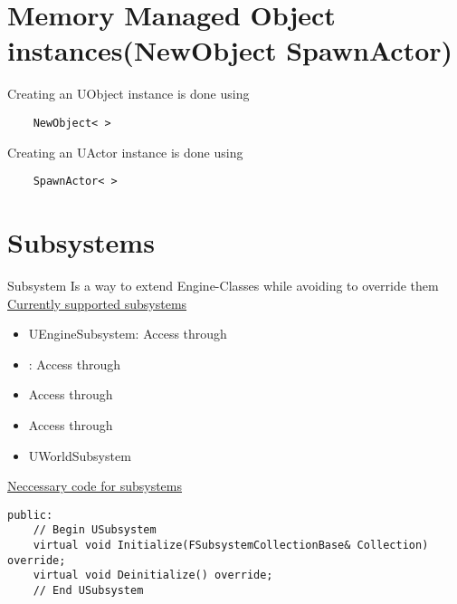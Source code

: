     \section{Memory Managed Object instances(NewObject SpawnActor)}
        Creating an UObject instance is done using
        \begin{lstlisting}
    NewObject< >
        \end{lstlisting}
        Creating an UActor instance is done using
        \begin{lstlisting}
    SpawnActor< >
        \end{lstlisting}

    \section{Subsystems}
        \glsdesc{Subsystem}
        Is a way to extend Engine-Classes while avoiding to override them \\
        \uline{Currently supported subsystems}
        \begin{itemize}
            \item UEngineSubsystem: Access through 
            \item {} : Access through 
            \item {} Access through 
            \item {} Access through 
            \item UWorldSubsystem
        \end{itemize}
        \uline{Neccessary code for subsystems}
        \begin{lstlisting}
public:
    // Begin USubsystem
    virtual void Initialize(FSubsystemCollectionBase& Collection) override;
    virtual void Deinitialize() override;
    // End USubsystem
        \end{lstlisting}

